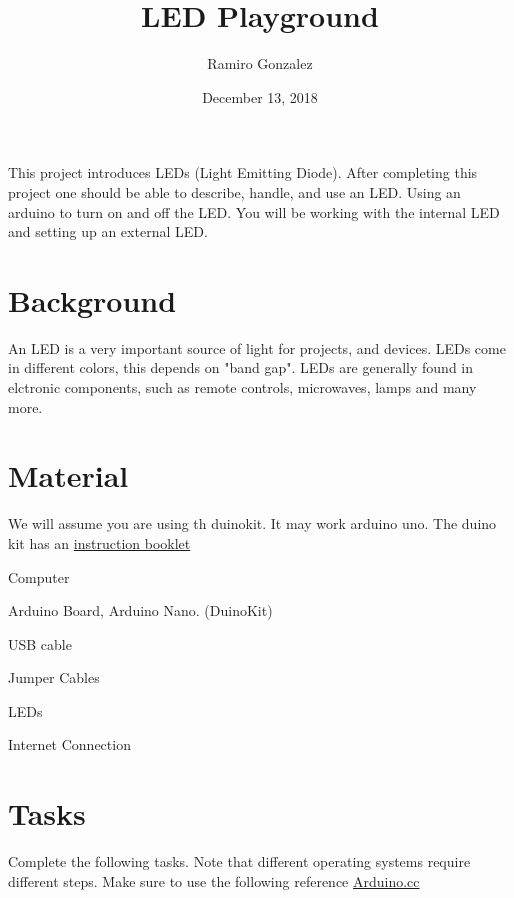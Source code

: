 \documentclass[12pt]{article}
\begin{document}
\title{LED Playground}
\author{Ramiro Gonzalez}
\date{December 13, 2018}

\maketitle

\begin{Objective}
	This project introduces LEDs (Light Emitting Diode). After completing this project one should be able to describe, handle, and use an LED.  Using an arduino to turn on and off the LED. You will be working with the internal LED and setting up an external LED. 
\end{Objective}

\section*{Background}
	An LED is a very important source of light for projects, and devices. LEDs come in different colors, this depends on "band gap". LEDs are generally found in elctronic components, such as remote controls, microwaves, lamps and many more. 
\section*{Material}
We will assume you are using th duinokit. It may work arduino uno. The duino kit has an \color{red} \href{https://drive.google.com/file/d/0B4XGOMubJWWralp1TlBEcnI4NnM/view?usp=sharing}{instruction booklet} \color{black}  
\begin{todolist}
    \item Computer 
    \item Arduino Board, Arduino Nano. (DuinoKit) 
    \item USB cable
    \item Jumper Cables
    \item LEDs
    \item Internet Connection
\end{todolist}
\section{Tasks}
Complete the following tasks. Note that different operating systems require different steps. Make sure to use the following reference \href{www.arduino.cc}{Arduino.cc}
\end{document}
